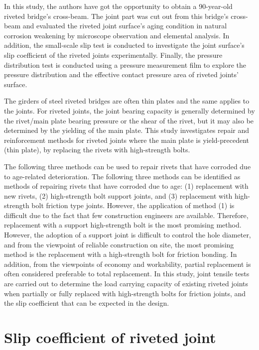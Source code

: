 In this study, the authors have got the opportunity to obtain a 90-year-old riveted bridge's cross-beam. The joint part was cut out from this bridge's cross-beam and evaluated the riveted joint surface's aging condition in natural corrosion weakening by microscope observation and elemental analysis. In addition, the small-scale slip test is conducted to investigate the joint surface's slip coefficient of the riveted joints experimentally. Finally, the pressure distribution test is conducted using a pressure measurement film to explore the pressure distribution and the effective contact pressure area of riveted joints' surface.

The girders of steel riveted bridges are often thin plates and the same applies to the joints. For riveted joints, the joint bearing capacity is generally determined by the rivet/main plate bearing pressure or the shear of the rivet, but it may also be determined by the yielding of the main plate. This study investigates repair and reinforcement methods for riveted joints where the main plate is yield-precedent (thin plate), by replacing the rivets with high-strength bolts.

The following three methods can be used to repair rivets that have corroded due to age-related deterioration. The following three methods can be identified as methods of repairing rivets that have corroded due to age: (1) replacement with new rivets, (2) high-strength bolt support joints, and (3) replacement with high-strength bolt friction type joints. However, the application of method (1) is difficult due to the fact that few construction engineers are available. Therefore, replacement with a support high-strength bolt is the most promising method. However, the adoption of a support joint is difficult to control the hole diameter, and from the viewpoint of reliable construction on site, the most promising method is the replacement with a high-strength bolt for friction bonding. In addition, from the viewpoints of economy and workability, partial replacement is often considered preferable to total replacement. In this study, joint tensile tests are carried out to determine the load carrying capacity of existing riveted joints when partially or fully replaced with high-strength bolts for friction joints, and the slip coefficient that can be expected in the design.


\section{Slip coefficient of riveted joint}




